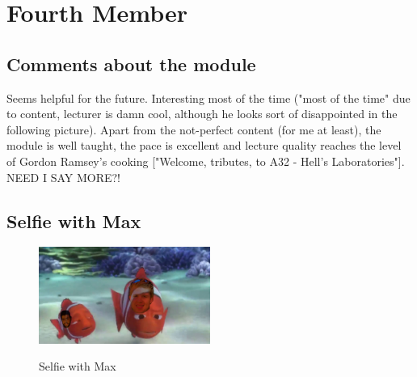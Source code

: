 \section{Fourth Member}


\subsection{Comments about the module}
Seems helpful for the future. Interesting most of the time ("most of the time" due to content, lecturer is damn cool, although he looks sort of disappointed in the following picture). Apart from the not-perfect content (for me at least), the module is well taught, the pace is excellent and lecture quality reaches the level of Gordon Ramsey's cooking ["Welcome, tributes, to A32 - Hell's Laboratories"]. NEED I SAY MORE?!

\subsection{Selfie with Max}

\begin{figure}[h]
\caption{Selfie with Max}
\centering
\includegraphics[width=0.5\textwidth]{nemo.jpg}
\label{fig:selfie}
\end{figure}

